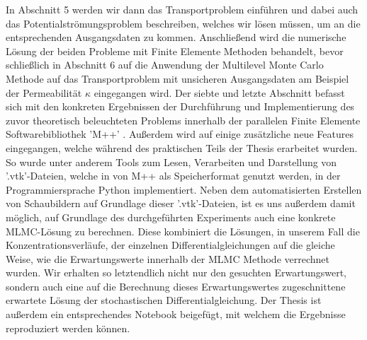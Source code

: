 In Abschnitt 5 werden wir dann das Transportproblem einführen und dabei auch das Potentialströmungsproblem beschreiben, welches wir lösen müssen, um an die entsprechenden Ausgangsdaten zu kommen. Anschließend wird die numerische Lösung der beiden Probleme mit Finite Elemente Methoden behandelt, bevor schließlich in Abschnitt 6 auf die Anwendung der Multilevel Monte Carlo Methode auf das Transportproblem mit unsicheren Ausgangsdaten am Beispiel der Permeabilität $\kappa$ eingegangen wird. 
Der siebte und letzte Abschnitt befasst sich mit den konkreten Ergebnissen der Durchführung und Implementierung des zuvor theoretisch beleuchteten Problems innerhalb der parallelen Finite Elemente Softwarebibliothek 'M++' \cite{siteM++}. Außerdem wird auf einige zusätzliche neue Features eingegangen, welche während des praktischen Teils der Thesis erarbeitet wurden. So wurde unter anderem Tools zum Lesen, Verarbeiten und Darstellung von '.vtk'-Dateien, welche in von M++ als Speicherformat genutzt werden, in der Programmiersprache Python implementiert. Neben dem automatisierten Erstellen von Schaubildern auf Grundlage dieser '.vtk'-Dateien, ist es uns außerdem damit möglich, auf Grundlage des durchgeführten Experiments auch eine konkrete MLMC-Lösung zu berechnen. Diese kombiniert die Lösungen, in unserem Fall die Konzentrations\-verläufe, der einzelnen Differentialgleichungen auf die gleiche Weise, wie die Erwartungswerte innerhalb der MLMC Methode verrechnet wurden. Wir erhalten so letztendlich nicht nur den gesuchten Erwartungswert, sondern auch eine auf die Berechnung dieses Erwartungswertes zugeschnittene erwartete Lösung der stochastischen Differentialgleichung. 
Der Thesis ist außerdem ein entsprechendes Notebook beigefügt, mit welchem die Ergebnisse reproduziert werden können.